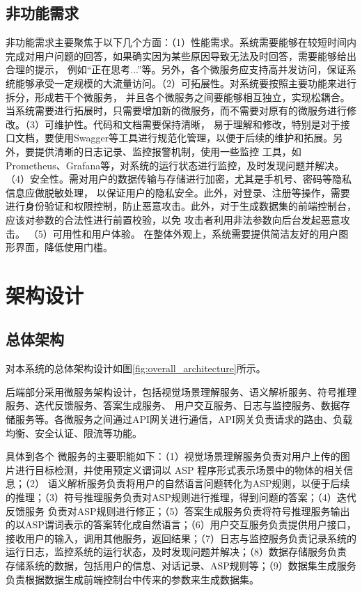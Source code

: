 \subsection{非功能需求}
非功能需求主要聚焦于以下几个方面：（1）性能需求。系统需要能够在较短时间内完成对用户问题的回答，如果确实因为某些原因导致无法及时回答，需要能够给出合理的提示，
例如“正在思考...”等。另外，各个微服务应支持高并发访问，保证系统能够承受一定规模的大流量访问。（2）可拓展性。对系统要按照主要功能来进行拆分，形成若干个微服务，
并且各个微服务之间要能够相互独立，实现松耦合。当系统需要进行拓展时，只需要增加新的微服务，而不需要对原有的微服务进行修改。（3）可维护性。代码和文档需要保持清晰，
易于理解和修改，特别是对于接口文档，要使用Swagger等工具进行规范化管理，以便于后续的维护和拓展。另外，要提供清晰的日志记录、监控报警机制，使用一些监控
工具，如Prometheus、Grafana等，对系统的运行状态进行监控，及时发现问题并解决。
（4）安全性。需对用户的数据传输与存储进行加密，尤其是手机号、密码等隐私信息应做脱敏处理，
以保证用户的隐私安全。此外，对登录、注册等操作，需要进行身份验证和权限控制，防止恶意攻击。此外，对于生成数据集的前端控制台，应该对参数的合法性进行前置校验，以免
攻击者利用非法参数向后台发起恶意攻击。
（5）可用性和用户体验。
在整体外观上，系统需要提供简洁友好的用户图形界面，降低使用门槛。

\section{架构设计}
\subsection{总体架构}
对本系统的总体架构设计如图\ref{fig:overall_architecture}所示。

后端部分采用微服务架构设计，包括视觉场景理解服务、语义解析服务、符号推理服务、迭代反馈服务、答案生成服务、
用户交互服务、日志与监控服务、数据存储服务等。各微服务之间通过API网关进行通信，API网关负责请求的路由、负载均衡、安全认证、限流等功能。

具体到各个
微服务的主要职能如下：（1）视觉场景理解服务负责对用户上传的图片进行目标检测，并使用预定义谓词以 ASP 程序形式表示场景中的物体的相关信息；（2）
语义解析服务负责将用户的自然语言问题转化为ASP规则，以便于后续的推理；（3）符号推理服务负责对ASP规则进行推理，得到问题的答案；（4）迭代反馈服务
负责对ASP规则进行修正；（5）答案生成服务负责将符号推理服务输出的以ASP谓词表示的答案转化成自然语言；（6）用户交互服务负责提供用户接口，
接收用户的输入，调用其他服务，返回结果；（7）日志与监控服务负责记录系统的运行日志，监控系统的运行状态，及时发现问题并解决；（8）数据存储服务负责
存储系统的数据，包括用户的信息、对话记录、ASP规则等；（9）数据集生成服务负责根据数据生成前端控制台中传来的参数来生成数据集。

